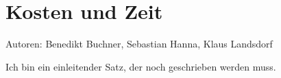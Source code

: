 \chapter{Kosten und Zeit}

Autoren: Benedikt Buchner, Sebastian Hanna, Klaus Landsdorf

Ich bin ein einleitender Satz, der noch geschrieben werden muss.



